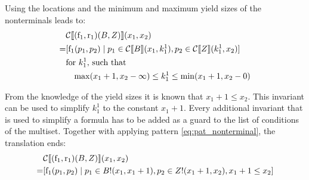 \documentclass[
    a4paper,
    12pt,
    twoside,
    BCOR=12mm,
    parskip=half,
    chapterprefix,
    numbers=noenddot,
    bibliography=totoc
]{scrbook}
\begin{document}
\pagebreak

Using the locations and the minimum and maximum yield sizes of the nonterminals leads to:	
\begin{align*}
    &\mathcal{C} \llbracket (\op{f}_1,\op{r}_1)(B,Z) \rrbracket (x_1,x_2) \\
  = &[ \op{f}_1(p_1,p_2) \mid p_1 \in \mathcal{C}\llbracket B \rrbracket (x_1,k^1_1),	p_2 \in \mathcal{C}\llbracket Z \rrbracket (k^1_1,x_2) ] \\
    &\text{for $k^1_1$, such that}\\
    &\quad\!\max(x_1 + 1, x_2 - \infty) \leq k^1_1 \leq \min(x_1 + 1, x_2 - 0)
\end{align*}

From the knowledge of the yield sizes it is known that $x_1 + 1 \leq x_2$. This invariant can be used to simplify $k^1_1$ to the constant $x_1 + 1$. Every additional invariant that is used to simplify a formula has to be added as a guard to the list of conditions of the multiset. Together with applying pattern \ref{eq:pat_nonterminal}, the translation ends:	
\begin{align*}
  &\mathcal{C} \llbracket (\op{f}_1,\op{r}_1)(B,Z) \rrbracket (x_1,x_2) \\
= &[ \op{f}_1(p_1,p_2) \mid p_1 \in B!(x_1,x_1+1), p_2 \in Z!(x_1+1,x_2), x_1 + 1 \leq x_2 ]
\end{align*}
\end{document}
